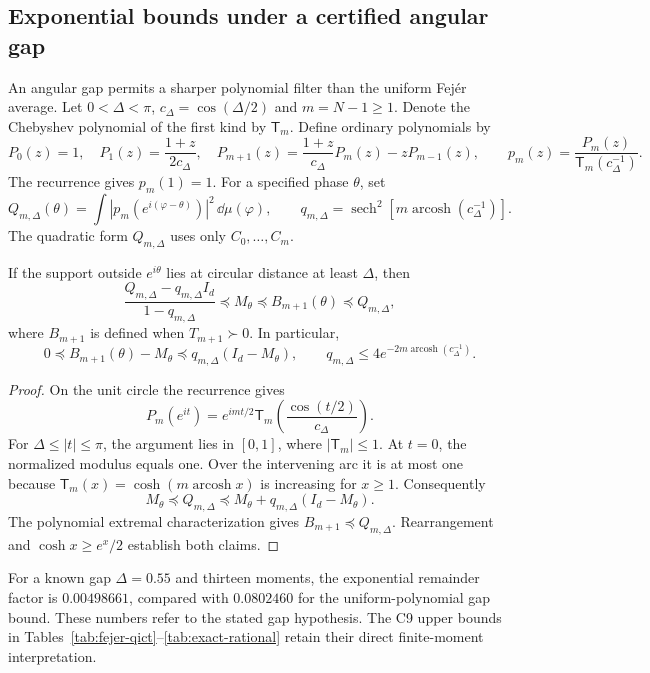 \subsection{Exponential bounds under a certified angular gap}
\label{sec:gap-filter}
An angular gap permits a sharper polynomial filter than the uniform Fej\'er average. Let $0<\Delta<\pi$, $c_\Delta=\cos(\Delta/2)$ and $m=N-1\geq1$. Denote the Chebyshev polynomial of the first kind by $\mathsf T_m$. Define ordinary polynomials by
\[
P_0(z)=1,\quad P_1(z)=\frac{1+z}{2c_\Delta},\quad
P_{m+1}(z)=\frac{1+z}{c_\Delta}P_m(z)-zP_{m-1}(z),
\qquad p_m(z)=\frac{P_m(z)}{\mathsf T_m(c_\Delta^{-1})}.
\]
The recurrence gives $p_m(1)=1$. For a specified phase $\theta$, set
\[
Q_{m,\Delta}(\theta)=\int|p_m(e^{i(\varphi-\theta)})|^2\,\dd\mu(\varphi),
\qquad
q_{m,\Delta}=\operatorname{sech}^2\!\left[m\operatorname{arcosh}(c_\Delta^{-1})\right].
\]
The quadratic form $Q_{m,\Delta}$ uses only $C_0,\ldots,C_m$.
\begin{proposition}\label{prop:exponential-gap}
If the support outside $e^{i\theta}$ lies at circular distance at least $\Delta$, then
\begin{equation}\label{eq:exponential-gap}
\frac{Q_{m,\Delta}-q_{m,\Delta}I_d}{1-q_{m,\Delta}}
\preceq M_\theta\preceq B_{m+1}(\theta)\preceq Q_{m,\Delta},
\end{equation}
where $B_{m+1}$ is defined when $T_{m+1}\succ0$. In particular,
\begin{equation}\label{eq:exponential-convergence}
0\preceq B_{m+1}(\theta)-M_\theta
\preceq q_{m,\Delta}(I_d-M_\theta),\qquad
q_{m,\Delta}\leq4e^{-2m\operatorname{arcosh}(c_\Delta^{-1})}.
\end{equation}
\end{proposition}
\begin{proof}
On the unit circle the recurrence gives
\[
P_m(e^{it})=e^{imt/2}\mathsf T_m\!\left(\frac{\cos(t/2)}{c_\Delta}\right).
\]
For $\Delta\leq|t|\leq\pi$, the argument lies in $[0,1]$, where $|\mathsf T_m|\leq1$. At $t=0$, the normalized modulus equals one. Over the intervening arc it is at most one because $\mathsf T_m(x)=\cosh(m\operatorname{arcosh}x)$ is increasing for $x\geq1$. Consequently
\[
M_\theta\preceq Q_{m,\Delta}\preceq M_\theta+q_{m,\Delta}(I_d-M_\theta).
\]
The polynomial extremal characterization gives $B_{m+1}\preceq Q_{m,\Delta}$. Rearrangement and $\cosh x\geq e^x/2$ establish both claims.
\end{proof}
For a known gap $\Delta=0.55$ and thirteen moments, the exponential remainder factor is $0.00498661$, compared with $0.0802460$ for the uniform-polynomial gap bound. These numbers refer to the stated gap hypothesis. The C9 upper bounds in Tables~\ref{tab:fejer-qict}--\ref{tab:exact-rational} retain their direct finite-moment interpretation.

